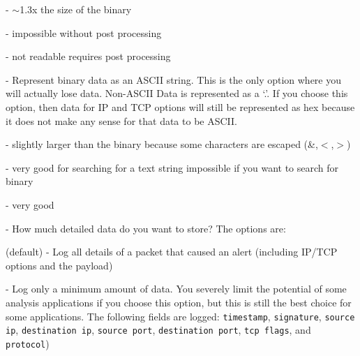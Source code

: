 \documentclass[english]{report}
\begin{document}
\begin{description}{}
\begin{description}{}
      \begin{description}{}
            \item [Storage~requirements]- $\sim$1.3x the size of the binary 
            \item [Searchability]- impossible without post processing 
            \item [Human~readability]- not readable requires post processing
      \end{description}

      \item [\texttt{ascii}] - Represent binary data as an ASCII string. This is
      the only option where you will actually lose data. Non-ASCII
      Data is represented as a `.'. If you choose this option, then data
      for IP and TCP options will still be represented as hex because
      it does not make any sense for that data to be ASCII.

\begin{description}{}

\item [Storage~requirements]- slightly larger than the binary because some
characters are escaped (\&,$<$,$>$)

\item [Searchability]- very good for searching for a text string impossible if
you want to search for binary 

\item [human~readability]- very good

\end{description}
\end{description}

\item [\texttt{detail}] - How much detailed data do you want to store? The
options are:

\begin{description}{}

\item [\texttt{full}](default) - Log all details of a packet that caused an
alert (including IP/TCP options and the payload)

\item [\texttt{fast}] - Log only a minimum amount of data. You severely limit
the potential of some analysis applications if you choose this option, but this
is still the best choice for some applications. The following fields are
logged: \texttt{timestamp}, \texttt{signature}, \texttt{source ip},
\texttt{destination ip}, \texttt{source port}, \texttt{destination port},
\texttt{tcp flags}, and \texttt{protocol})

\end{description}
\end{description}
\end{document}
